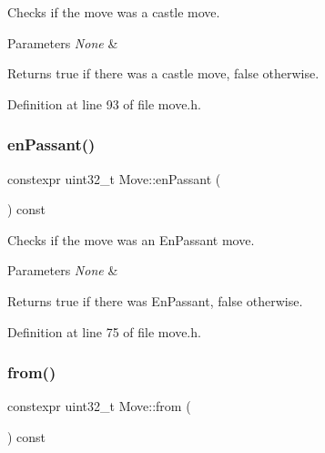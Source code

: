 Checks if the move was a castle move. 


\begin{DoxyParams}{Parameters}
{\em None} & \\
\hline
\end{DoxyParams}
\begin{DoxyReturn}{Returns}
true if there was a castle move, false otherwise. 
\end{DoxyReturn}


Definition at line 93 of file move.\+h.

\mbox{\label{classMove_a69a64f5ba158cf0f48765ea40de0daf0}} 
\subsubsection{\texorpdfstring{en\+Passant()}{enPassant()}}
{\footnotesize\ttfamily constexpr uint32\+\_\+t Move\+::en\+Passant (\begin{DoxyParamCaption}{ }\end{DoxyParamCaption}) const\hspace{0.3cm}{\ttfamily [inline]}}



Checks if the move was an En\+Passant move. 


\begin{DoxyParams}{Parameters}
{\em None} & \\
\hline
\end{DoxyParams}
\begin{DoxyReturn}{Returns}
true if there was En\+Passant, false otherwise. 
\end{DoxyReturn}


Definition at line 75 of file move.\+h.

\mbox{\label{classMove_a5a16b2160e1cb66cde53dd6251616243}} 
\subsubsection{\texorpdfstring{from()}{from()}}
{\footnotesize\ttfamily constexpr uint32\+\_\+t Move\+::from (\begin{DoxyParamCaption}{ }\end{DoxyParamCaption}) const\hspace{0.3cm}{\ttfamily [inline]}}



